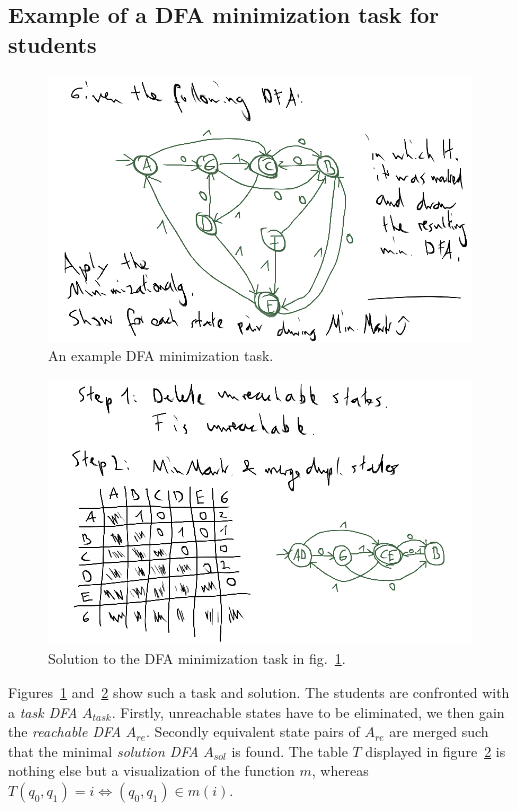 \subsection{Example of a DFA minimization task for students}


\begin{figure}
\includegraphics[width=\linewidth]{images/dfa_ex_task.png}
\caption{An example DFA minimization task.}
\label{fig:dfa_ex_task}
\end{figure}

\begin{figure}
\includegraphics[width=\linewidth]{images/dfa_ex_sol.png}
\caption{Solution to the DFA minimization task in fig.~\ref{fig:dfa_ex_task}.}
\label{fig:dfa_ex_sol}
\end{figure}

\noindent Figures~\ref{fig:dfa_ex_task} and~\ref{fig:dfa_ex_sol} show such a task and solution. The students are confronted with a \emph{task DFA} $A_{task}$. Firstly, unreachable states have to be eliminated, we then gain the \emph{reachable DFA} $A_{re}$. Secondly equivalent state pairs of $A_{re}$ are merged such that the minimal \emph{solution DFA} $A_{sol}$ is found. The table $T$ displayed in figure~\ref{fig:dfa_ex_sol} is nothing else but a visualization of the function $m$, whereas $T(q_0, q_1) = i \Leftrightarrow (q_0, q_1) \in m(i)$.

